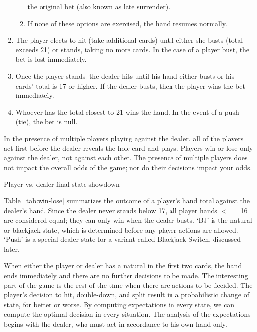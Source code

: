 \begin{enumerate}
\begin{enumerate}
the original bet (also known as late surrender).
\item If none of these options are exercised, the hand resumes normally.
\end{enumerate}
\item The player elects to hit (take additional cards) until either
she busts (total exceeds 21) or stands, taking no more cards.
In the case of a player bust, the bet is lost immediately.
\item Once the player stands, the dealer hits until his hand either busts
or his cards' total is 17 or higher.  
If the dealer busts, then the player wins the bet immediately.  
\item Whoever has the total closest to 21 wins the hand.
In the event of a push (tie), the bet is null.
\end{enumerate}


In the presence of multiple players playing against the dealer, 
all of the players act first before the dealer reveals the hole card
and plays.  
Players win or lose only against the dealer, not against each other.
The presence of multiple players does not impact the overall 
odds of the game; nor do their decisions impact your odds.

\begin{table}[ht!]
\caption{Player vs. dealer final state showdown}
\begin{center}

\end{center}
\label{tab:win-lose}
\end{table}

Table~\ref{tab:win-lose} summarizes the outcome of a player's hand total
against the dealer's hand.
Since the dealer never stands below 17, all player hands $<=$ 16
are considered equal; they can only win when the dealer busts.
`BJ' is the natural or blackjack state, which is determined 
before any player actions are allowed.
`Push' is a special dealer state for a variant called Blackjack Switch, 
discussed later.

When either the player or dealer has a natural
in the first two cards, the hand ends immediately
and there are no further decisions to be made.
The interesting part of the game is the rest of the time when
there are actions to be decided.
The player's decision to hit, double-down, and split
result in a probabilistic change of state, for better or worse.
By computing expectations in every state, 
we can compute the optimal decision in every situation.  
The analysis of the expectations begins with
the dealer, who must act in accordance to his own hand only.

